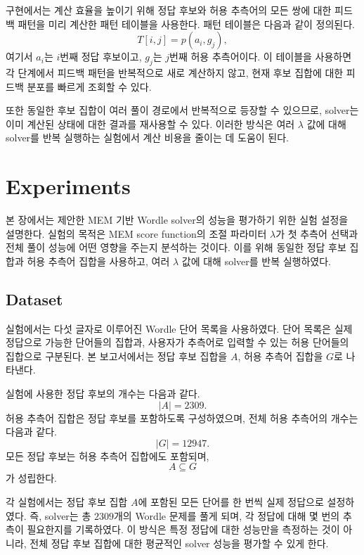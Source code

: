 \documentclass[11pt]{article}
\begin{document}
구현에서는 계산 효율을 높이기 위해 정답 후보와 허용 추측어의 모든 쌍에 대한 피드백 패턴을 미리 계산한 패턴 테이블을 사용한다.
패턴 테이블은 다음과 같이 정의된다.
\[
T[i,j] = p(a_i, g_j),
\]
여기서 $a_i$는 $i$번째 정답 후보이고, $g_j$는 $j$번째 허용 추측어이다.
이 테이블을 사용하면 각 단계에서 피드백 패턴을 반복적으로 새로 계산하지 않고, 현재 후보 집합에 대한 피드백 분포를 빠르게 조회할 수 있다.

또한 동일한 후보 집합이 여러 풀이 경로에서 반복적으로 등장할 수 있으므로, solver는 이미 계산된 상태에 대한 결과를 재사용할 수 있다.
이러한 방식은 여러 $\lambda$ 값에 대해 solver를 반복 실행하는 실험에서 계산 비용을 줄이는 데 도움이 된다.















\section{Experiments}
\label{sec:experiments}

본 장에서는 제안한 MEM 기반 Wordle solver의 성능을 평가하기 위한 실험 설정을 설명한다.
실험의 목적은 MEM score function의 조절 파라미터 $\lambda$가 첫 추측어 선택과 전체 풀이 성능에 어떤 영향을 주는지 분석하는 것이다.
이를 위해 동일한 정답 후보 집합과 허용 추측어 집합을 사용하고, 여러 $\lambda$ 값에 대해 solver를 반복 실행하였다.

\subsection{Dataset}

실험에서는 다섯 글자로 이루어진 Wordle 단어 목록을 사용하였다.
단어 목록은 실제 정답으로 가능한 단어들의 집합과, 사용자가 추측어로 입력할 수 있는 허용 단어들의 집합으로 구분된다.
본 보고서에서는 정답 후보 집합을 $A$, 허용 추측어 집합을 $G$로 나타낸다.

실험에 사용한 정답 후보의 개수는 다음과 같다.
\[
|A| = 2309.
\]
허용 추측어 집합은 정답 후보를 포함하도록 구성하였으며, 전체 허용 추측어의 개수는 다음과 같다.
\[
|G| = 12947.
\]
모든 정답 후보는 허용 추측어 집합에도 포함되며,
\[
A \subseteq G
\]
가 성립한다.

각 실험에서는 정답 후보 집합 $A$에 포함된 모든 단어를 한 번씩 실제 정답으로 설정하였다.
즉, solver는 총 $2309$개의 Wordle 문제를 풀게 되며, 각 정답에 대해 몇 번의 추측이 필요한지를 기록하였다.
이 방식은 특정 정답에 대한 성능만을 측정하는 것이 아니라, 전체 정답 후보 집합에 대한 평균적인 solver 성능을 평가할 수 있게 한다.
\end{document}
